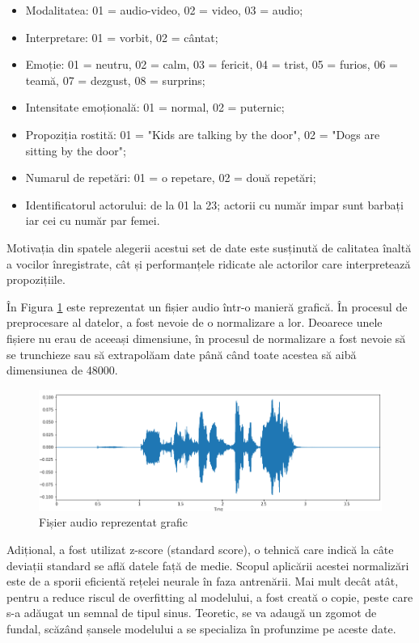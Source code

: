 \documentclass[a4paper, 12pt]{report}
\begin{document}
	\begin{itemize}
		\item Modalitatea: 01 = audio-video, 02 = video, 03 = audio;
		\item Interpretare: 01 = vorbit, 02 = cântat;
		\item Emoție: 01 = neutru, 02 = calm, 03 = fericit, 04 = trist, 05 = furios, 06 = teamă, 07 = dezgust, 08 = surprins;
		\item Intensitate emoțională: 01 = normal, 02 = puternic;
		\item Propoziția rostită: 01 = "Kids are talking by the door", 02 = "Dogs are sitting by the door";
		\item Numarul de repetări: 01 = o repetare, 02 = două repetări;
		\item Identificatorul actorului: de la 01 la 23; actorii cu număr impar sunt barbați iar cei cu număr par femei.
	\end{itemize}

	Motivația din spatele alegerii acestui set de date este susținută de calitatea înaltă a vocilor înregistrate, cât și performanțele ridicate ale actorilor care interpretează propozițiile.
	
	În Figura \ref{fig:audio_plot} este reprezentat un fișier audio într-o manieră grafică. În procesul de preprocesare al datelor, a fost nevoie de o normalizare a lor. Deoarece unele fișiere nu erau de aceeași dimensiune, în procesul de normalizare a fost nevoie să se trunchieze sau să extrapolăam date până când toate acestea să aibă dimensiunea de 48000.
	
	\begin{figure}[H]
		\begin{center}
			\includegraphics[scale=0.6]{images/audio_plot.png}
		\end{center}
		\caption{Fișier audio reprezentat grafic}
		\label{fig:audio_plot}
	\end{figure}
	
	Adițional, a fost utilizat z-score (standard score), o tehnică care indică la câte deviații standard se află datele față de medie. Scopul aplicării acestei normalizări este de a sporii eficientă rețelei neurale în faza antrenării. Mai mult decât atât, pentru a reduce riscul de overfitting al modelului, a fost creată o copie, peste care s-a adăugat un semnal de tipul sinus. Teoretic, se va adaugă un zgomot de fundal, scăzând șansele modelului a se specializa în profunzime pe aceste date.
	
\end{document}
